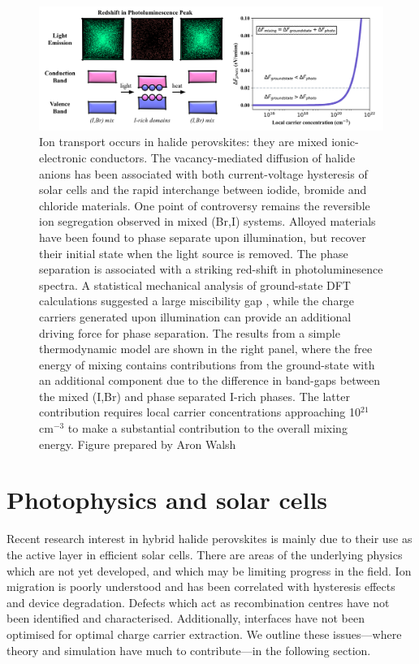 \begin{figure} 
\includegraphics[width=1.0\textwidth]{./figures/ch2/f4.png}
\caption[Simple phase segregation model]{
Ion transport occurs in halide perovskites: they are mixed ionic-electronic conductors. The vacancy-mediated diffusion of halide anions has been associated with both current-voltage hysteresis of solar cells and the rapid interchange between iodide, bromide and chloride materials.
One point of controversy remains the reversible ion segregation observed in mixed (Br,I) systems. 
Alloyed materials have been found to phase separate upon illumination, but recover their initial state when the light source is removed. 
The phase separation is associated with a striking red-shift in  photoluminesence spectra.
A statistical mechanical analysis of ground-state DFT calculations suggested a large miscibility gap \autocite{Brivio2016}, while the charge carriers generated upon illumination can provide an additional driving force for phase separation.\autocite{Slotcavage2016}
The results from a simple thermodynamic model are shown in the right panel, where the free energy of mixing contains contributions from the ground-state with an additional component due to the difference in band-gaps between the mixed (I,Br) and phase separated I-rich phases. 
The latter contribution requires local carrier concentrations approaching 10$^{21}$ cm$^{-3}$ to make a substantial contribution to the overall mixing energy. Figure prepared by Aron Walsh
}
\label{fig4}
\end{figure}

\section{Photophysics and solar cells}

Recent research interest in hybrid halide perovskites is mainly due to their use as the active layer in efficient solar cells.
There are areas of the underlying physics which are not yet developed, and which may be limiting progress in the field.
Ion migration is poorly understood and has been correlated with hysteresis effects\autocite{Eames2015a,Richardson2016} and device degradation.
Defects which act as recombination centres have not been identified and characterised. 
Additionally, interfaces have not been optimised for optimal charge carrier extraction.
We outline these issues---where theory and simulation have much to contribute---in the following section.

